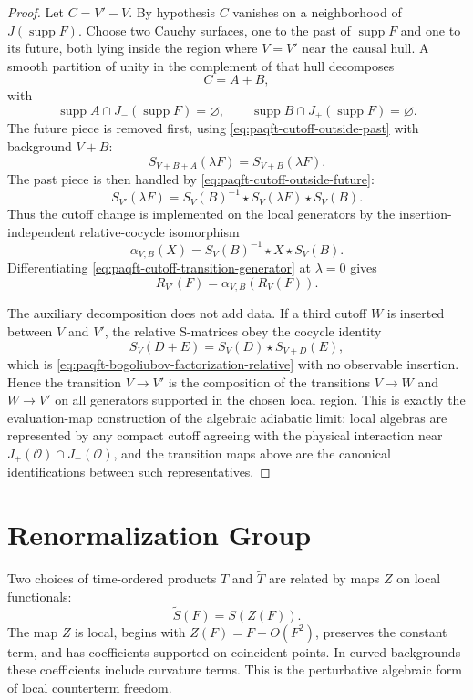 \begin{proof}
Let \(C=V'-V\).  By hypothesis \(C\) vanishes on a neighborhood of
\(J(\operatorname{supp}F)\).  Choose two Cauchy surfaces, one to the past of
\(\operatorname{supp}F\) and one to its future, both lying inside the region
where \(V=V'\) near the causal hull.  A smooth partition of unity in the
complement of that hull decomposes
\[
  C=A+B,
\]
with
\[
  \operatorname{supp}A\cap J_-(\operatorname{supp}F)=\varnothing,
  \qquad
  \operatorname{supp}B\cap J_+(\operatorname{supp}F)=\varnothing .
\]
The future piece is removed first, using
\eqref{eq:paqft-cutoff-outside-past} with background \(V+B\):
\[
  S_{V+B+A}(\lambda F)=S_{V+B}(\lambda F).
\]
The past piece is then handled by
\eqref{eq:paqft-cutoff-outside-future}:
\begin{equation}
  S_{V'}(\lambda F)
  =
  S_V(B)^{-1}\star S_V(\lambda F)\star S_V(B).
  \label{eq:paqft-cutoff-transition-generator}
\end{equation}
Thus the cutoff change is implemented on the local generators by the
insertion-independent relative-cocycle isomorphism
\[
  \alpha_{V,B}(X)=S_V(B)^{-1}\star X\star S_V(B).
\]
Differentiating \eqref{eq:paqft-cutoff-transition-generator} at
\(\lambda=0\) gives
\[
  R_{V'}(F)=\alpha_{V,B}(R_V(F)).
\]

The auxiliary decomposition does not add data.  If a third cutoff \(W\) is
inserted between \(V\) and \(V'\), the relative S-matrices obey the cocycle
identity
\[
  S_V(D+E)=S_V(D)\star S_{V+D}(E),
\]
which is \eqref{eq:paqft-bogoliubov-factorization-relative} with no
observable insertion.  Hence the transition \(V\to V'\) is the composition of
the transitions \(V\to W\) and \(W\to V'\) on all generators supported in the
chosen local region.  This is exactly the evaluation-map construction of the
algebraic adiabatic limit: local algebras are represented by any compact
cutoff agreeing with the physical interaction near
\(J_+(\mathcal O)\cap J_-(\mathcal O)\), and the transition maps above are
the canonical identifications between such representatives.
\end{proof}

\section{Renormalization Group}

Two choices of time-ordered products \(T\) and \(\widetilde T\) are related
by maps \(Z\) on local functionals:
\[
  \widetilde S(F)=S(Z(F)).
\]
The map \(Z\) is local, begins with \(Z(F)=F+O(F^2)\), preserves the constant
term, and has coefficients supported on coincident points.  In curved
backgrounds these coefficients include curvature terms.  This is the
perturbative algebraic form of local counterterm freedom.

